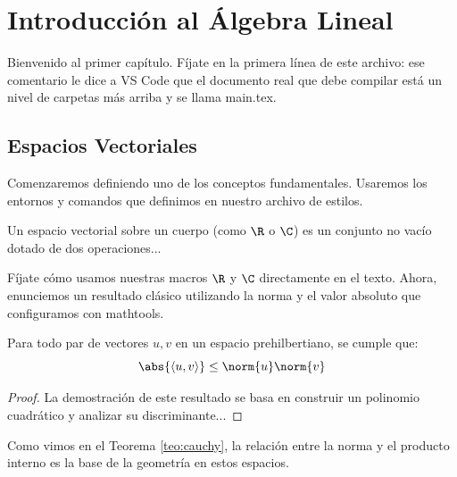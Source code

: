 
\chapter{Introducción al Álgebra Lineal}
\label{cap:introduccion}

Bienvenido al primer capítulo. Fíjate en la primera línea de este archivo: ese comentario le dice a VS Code que el documento real que debe compilar está un nivel de carpetas más arriba y se llama main.tex.

\section{Espacios Vectoriales}
\label{sec:espacios_vectoriales}

Comenzaremos definiendo uno de los conceptos fundamentales. Usaremos los entornos y comandos que definimos en nuestro archivo de estilos.

\begin{definicion}
    \label{def:espacio_vectorial}
    Un espacio vectorial sobre un cuerpo (como $\R$ o $\C$) es un conjunto no vacío dotado de dos operaciones...
\end{definicion}

Fíjate cómo usamos nuestras macros $\R$ y $\C$ directamente en el texto. Ahora, enunciemos un resultado clásico utilizando la norma y el valor absoluto que configuramos con mathtools.

\begin{teorema}
    \label{teo:cauchy}
    Para todo par de vectores $u, v$ en un espacio prehilbertiano, se cumple que:
    $$ \abs{\langle u, v \rangle} \leq \norm{u} \norm{v} $$
\end{teorema}

\begin{proof}
    La demostración de este resultado se basa en construir un polinomio cuadrático y analizar su discriminante...
\end{proof}

Como vimos en el Teorema \ref{teo:cauchy}, la relación entre la norma y el producto interno es la base de la geometría en estos espacios.